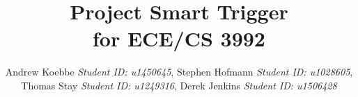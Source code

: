 \documentclass[11pt, journal]{IEEEtran}
\begin{document}
%
\title{Project Smart Trigger \\ for ECE/CS 3992}
%
%
%

\author{Andrew Koebbe \textit{Student ID: u1450645}, Stephen Hofmann \textit{Student ID: u1028605},\\ Thomas Stay \textit{Student ID: u1249316}, Derek Jenkins \textit{Student ID: u1506428}}%


% 
%



% 
\end{document}

